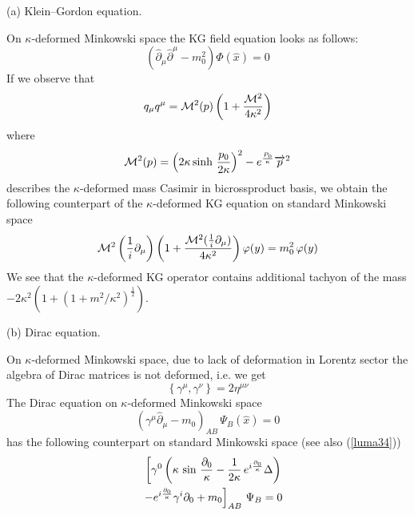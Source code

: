 \documentclass[a4paper,a4paper]{article}
\begin{document}
(a) Klein--Gordon equation.

On $\kappa$-deformed Minkowski space the KG   field equation
looks as follows:
\begin{equation}\label{luma35}  %
  \left( \widehat{\partial}_{\mu} \widehat{\partial}^{\mu} -
  m^{2}_{0} \right)
  \Phi( \widehat{x}) = 0
\end{equation}
If we observe that
\begin{equation}\label{luma36} %
  q_{\mu}q^{\mu} = {\cal M}^{2} (p)
   \left(
   1 + {{\cal  M}^{2} \over 4 \kappa^{2}} \right)
\end{equation}
where
\begin{equation}\label{luma37} %
  {\cal M}^{2} (p) =
  \left( 2 \kappa  \sinh \, {p_{0} \over 2 \kappa }\right)^{2} -
  e^{{P_{0}\over \kappa}} \overrightarrow{p}^{2}
\end{equation}
describes the $\kappa$-deformed mass Casimir in bicrossproduct
basis, we obtain  the following counterpart of the
$\kappa$-deformed KG equation  on standard Minkowski space
\begin{equation}\label{luma38}      %
  {\cal M}^{2} \left( {1\over i} \partial_{\mu} \right)
  \left( 1 + { {\cal M}^{2}( {1\over i} \partial_{\mu} )\over
  4\kappa^{2}} \right) \varphi(y) = m^{2}_{0} \, \varphi(y)
\end{equation}
We see that the $\kappa$-deformed KG operator
     contains additional
tachyon of the mass  $-2 \kappa^2 (1+(1+m^2/
\kappa^2)^{\frac{1}{2}}) $.

(b) Dirac equation.

On $\kappa$-deformed Minkowski space, due to lack of deformation
in Lorentz sector the algebra of Dirac matrices is not deformed,
i.e. we get
\begin{equation}\label{luma39}  %
  \left\{ \gamma^{\mu},\gamma^{\nu} \right\} = 2\eta^{\mu\nu}
\end{equation}
The Dirac equation on $\kappa$-deformed Minkowski space
\begin{equation}\label{luma40} %
  \left(
 \gamma^{\mu} \widehat{\partial}_{\mu} - m_{0} \right)_{AB}
 \, \Psi_{B} ( \widehat{x} ) = 0
\end{equation}
has the following counterpart on standard Minkowski space (see
also (\ref{luma34}))
\begin{eqnarray} \label{luma41}  %
&&  \left[ \gamma^{0}
\left(
\kappa \,
   \sin \, {\partial_{0} \over \kappa}
-
  {1\over 2 \kappa} \,
e^{i {\partial_{0}\over \kappa}} \Delta
  \right) \right.
  \cr
  &&
\left.
   -
  e^{i {\partial_{0}\over \kappa}}
  \gamma^{i}      \partial_{0} +
  m_{0} \right]_{AB} \, \Psi_{B} = 0
\end{eqnarray}
\end{document}
